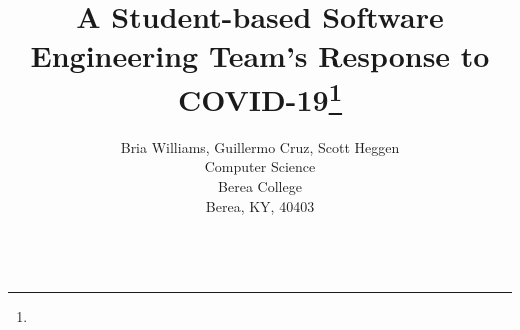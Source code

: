 \documentclass{article}
\title{A Student-based Software Engineering Team's Response to COVID-19\footnote{\protect}}
\author{
Bria Williams, Guillermo Cruz, Scott Heggen\\
Computer Science\\
Berea College\\
Berea, KY, 40403\\
\email{\{williamsbri,cruzg,heggens\}@berea.edu}\\
}
\begin{document}
\maketitle

\begin{abstract}
 
\end{abstract}


% 




\medskip



\end{document}
